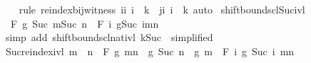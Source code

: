 \begin{isabellebody}
%
\isadelimproof
\ \ %
\endisadelimproof
%
\isatagproof
{}\isamarkupfalse%
\ {\isacharparenleft}{\kern0pt}rule\ reindex{\isacharunderscore}{\kern0pt}bij{\isacharunderscore}{\kern0pt}witness{\isacharbrackleft}{\kern0pt}\ i{\isacharequal}{\kern0pt}{\isachardoublequoteopen}{\isasymlambda}i{\isachardot}{\kern0pt}\ i\ {\isacharplus}{\kern0pt}\ k{\isachardoublequoteclose}\ \ j{\isacharequal}{\kern0pt}{\isachardoublequoteopen}{\isasymlambda}i{\isachardot}{\kern0pt}\ i\ {\isacharminus}{\kern0pt}\ k{\isachardoublequoteclose}{\isacharbrackright}{\kern0pt}{\isacharparenright}{\kern0pt}\ auto%
\endisatagproof
{\isafoldproof}%
%
\isadelimproof
\isanewline
%
\endisadelimproof
\isanewline
{}\isamarkupfalse%
\ shift{\isacharunderscore}{\kern0pt}bounds{\isacharunderscore}{\kern0pt}cl{\isacharunderscore}{\kern0pt}Suc{\isacharunderscore}{\kern0pt}ivl{\isacharcolon}{\kern0pt}\isanewline
\ \ {\isachardoublequoteopen}F\ g\ {\isacharbraceleft}{\kern0pt}Suc\ m{\isachardot}{\kern0pt}{\isachardot}{\kern0pt}Suc\ n{\isacharbraceright}{\kern0pt}\ {\isacharequal}{\kern0pt}\ F\ {\isacharparenleft}{\kern0pt}{\isasymlambda}i{\isachardot}{\kern0pt}\ g{\isacharparenleft}{\kern0pt}Suc\ i{\isacharparenright}{\kern0pt}{\isacharparenright}{\kern0pt}{\isacharbraceleft}{\kern0pt}m{\isachardot}{\kern0pt}{\isachardot}{\kern0pt}n{\isacharbraceright}{\kern0pt}{\isachardoublequoteclose}\isanewline
%
\isadelimproof
%
\endisadelimproof
%
\isatagproof
{}\isamarkupfalse%
\ {\isacharparenleft}{\kern0pt}simp\ add{\isacharcolon}{\kern0pt}\ shift{\isacharunderscore}{\kern0pt}bounds{\isacharunderscore}{\kern0pt}cl{\isacharunderscore}{\kern0pt}nat{\isacharunderscore}{\kern0pt}ivl{\isacharbrackleft}{\kern0pt}\ k{\isacharequal}{\kern0pt}{\isachardoublequoteopen}Suc\ {}{\isachardoublequoteclose}{\isacharcomma}{\kern0pt}\ simplified{\isacharbrackright}{\kern0pt}{\isacharparenright}{\kern0pt}%
\endisatagproof
{\isafoldproof}%
%
\isadelimproof
\isanewline
%
\endisadelimproof
\isanewline
{}\isamarkupfalse%
\ Suc{\isacharunderscore}{\kern0pt}reindex{\isacharunderscore}{\kern0pt}ivl{\isacharcolon}{\kern0pt}\ {\isachardoublequoteopen}m\ {\isasymle}\ n\ {\isasymLongrightarrow}\ F\ g\ {\isacharbraceleft}{\kern0pt}m{\isachardot}{\kern0pt}{\isachardot}{\kern0pt}n{\isacharbraceright}{\kern0pt}\ \isactrlbold {\isacharasterisk}{\kern0pt}\ g\ {\isacharparenleft}{\kern0pt}Suc\ n{\isacharparenright}{\kern0pt}\ {\isacharequal}{\kern0pt}\ g\ m\ \isactrlbold {\isacharasterisk}{\kern0pt}\ F\ {\isacharparenleft}{\kern0pt}{\isasymlambda}i{\isachardot}{\kern0pt}\ g\ {\isacharparenleft}{\kern0pt}Suc\ i{\isacharparenright}{\kern0pt}{\isacharparenright}{\kern0pt}\ {\isacharbraceleft}{\kern0pt}m{\isachardot}{\kern0pt}{\isachardot}{\kern0pt}n{\isacharbraceright}{\kern0pt}{\isachardoublequoteclose}\isanewline

\end{isabellebody}
